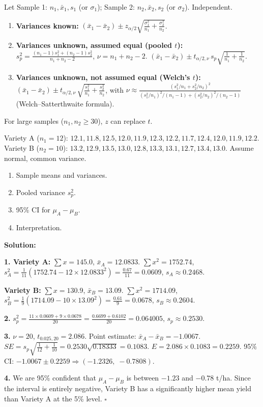 \documentclass[11pt]{article}
\providecommand{\qed}{\hfill$\square$}
\begin{document}
\begin{propriete}
Let Sample 1: $n_1, \bar{x}_1, s_1$ (or $\sigma_1$); Sample 2: $n_2, \bar{x}_2, s_2$ (or $\sigma_2$). Independent.
\begin{enumerate}
\item \textbf{Variances known:} $(\bar{x}_1-\bar{x}_2) \pm z_{\alpha/2}\sqrt{\frac{\sigma_1^2}{n_1}+\frac{\sigma_2^2}{n_2}}$.
\item \textbf{Variances unknown, assumed equal (pooled $t$):}
$s_p^2 = \frac{(n_1-1)s_1^2+(n_2-1)s_2^2}{n_1+n_2-2}$, $\nu = n_1+n_2-2$.
$(\bar{x}_1-\bar{x}_2) \pm t_{\alpha/2,\nu}\, s_p\sqrt{\frac{1}{n_1}+\frac{1}{n_2}}$.
\item \textbf{Variances unknown, not assumed equal (Welch's $t$):}
$(\bar{x}_1-\bar{x}_2) \pm t_{\alpha/2,\nu}\, \sqrt{\frac{s_1^2}{n_1}+\frac{s_2^2}{n_2}}$,
with $\nu \approx \frac{(s_1^2/n_1 + s_2^2/n_2)^2}{(s_1^2/n_1)^2/(n_1-1) + (s_2^2/n_2)^2/(n_2-1)}$ (Welch--Satterthwaite formula).
\end{enumerate}
For large samples ($n_1,n_2 \ge 30$), $z$ can replace $t$.
\end{propriete}

\begin{exoresolu}
Variety A ($n_1=12$): $12.1, 11.8, 12.5, 12.0, 11.9, 12.3, 12.2, 11.7, 12.4, 12.0, 11.9, 12.2$.
Variety B ($n_2=10$): $13.2, 12.9, 13.5, 13.0, 12.8, 13.3, 13.1, 12.7, 13.4, 13.0$.
Assume normal, common variance.
\begin{enumerate}
\item Sample means and variances.
\item Pooled variance $s_p^2$.
\item 95\% CI for $\mu_A - \mu_B$.
\item Interpretation.
\end{enumerate}
\tcblower
\textbf{Solution:}

\textbf{1. Variety A:} $\sum x = 145.0$, $\bar{x}_A = 12.0833$.
$\sum x^2 = 1752.74$, $s_A^2 = \frac{1}{11}(1752.74 - 12\times12.0833^2) = \frac{0.67}{11} = 0.0609$, $s_A \approx 0.2468$.

\textbf{Variety B:} $\sum x = 130.9$, $\bar{x}_B = 13.09$.
$\sum x^2 = 1714.09$, $s_B^2 = \frac{1}{9}(1714.09 - 10\times13.09^2) = \frac{0.61}{9} = 0.0678$, $s_B \approx 0.2604$.

\textbf{2.} $s_p^2 = \frac{11\times0.0609 + 9\times0.0678}{20} = \frac{0.6699+0.6102}{20} = 0.064005$, $s_p \approx 0.2530$.

\textbf{3.} $\nu=20$, $t_{0.025,20}=2.086$.
Point estimate: $\bar{x}_A - \bar{x}_B = -1.0067$.
$SE = s_p\sqrt{\frac{1}{12}+\frac{1}{10}} = 0.2530\sqrt{0.18333} = 0.1083$.
$E = 2.086 \times 0.1083 = 0.2259$.
95\% CI: $-1.0067 \pm 0.2259 \Rightarrow (-1.2326,\; -0.7808)$.

\textbf{4.} We are 95\% confident that $\mu_A - \mu_B$ is between $-1.23$ and $-0.78$ t/ha. Since the interval is entirely negative, Variety B has a significantly higher mean yield than Variety A at the 5\% level. \qed
\end{exoresolu}
\end{document}
